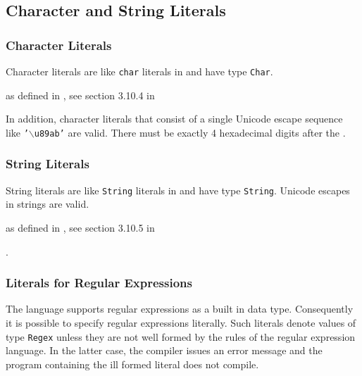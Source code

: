 \subsection{Character and String Literals}

\subsubsection{Character Literals} \label{charliteral}

Character literals are like \texttt{char} literals in \java{} and have type \texttt{Char}.

\begin{flushleft}
as defined in \java{}, see section 3.10.4 in \cite{langspec3}\\
\end{flushleft}

In addition, character literals that consist of a single Unicode escape sequence like \texttt{'$\backslash$u89ab'} are valid. There must be exactly 4 hexadecimal digits after the .

\subsubsection{String Literals}

String literals are like \texttt{String} literals in \java{} and have type \texttt{String}. Unicode escapes in strings are valid.

\begin{flushleft}
as defined in \java{}, see section 3.10.5 in \cite{langspec3}\\
\end{flushleft}

.

\subsubsection{Literals for Regular Expressions} \label{regexliteral}

The \frege{} language supports regular expressions as a built in data type. Consequently it is possible to specify regular expressions literally. Such literals denote values of type \texttt{Regex} unless they are not well formed by the rules of the regular expression language. In the latter case, the compiler issues an error message and the program containing the ill formed literal does not compile.

